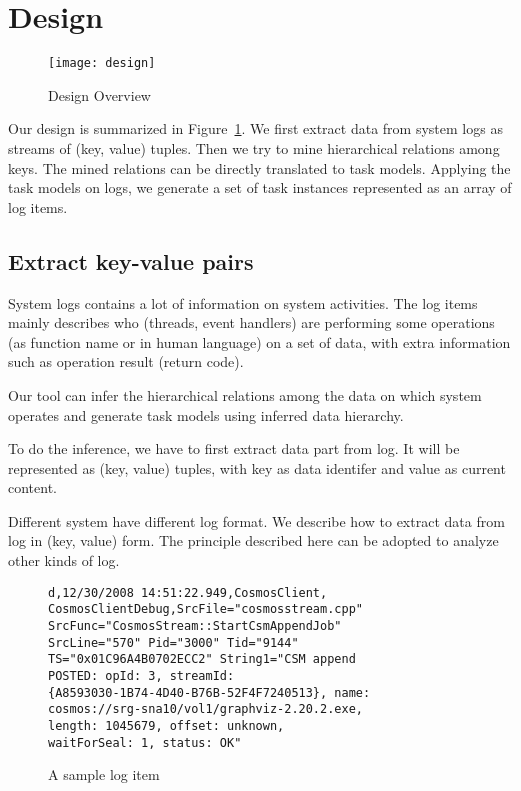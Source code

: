 
\section{Design}
\label{sec:design}

\begin{figure}
\centering
\texttt{[image: design]}
\caption{Design Overview}
\label{fig:design}
\end{figure}

Our design is summarized in Figure~\ref{fig:design}. We
first extract data from system logs as streams of (key,
value) tuples. Then we try to mine hierarchical relations
among keys. The mined relations can be directly translated
to task models. Applying the task models on logs, we
generate a set of task instances represented as an array of
log items.


\subsection{Extract key-value pairs}

System logs contains a lot of information on system
activities. The log items mainly describes who (threads,
event handlers) are performing some operations (as function
name or in human language) on a set of data, with extra
information such as operation result (return code).

Our tool can infer the hierarchical relations among the data
on which system operates and generate task models using
inferred data hierarchy.

To do the inference, we have to first extract data part
from log. It will be represented as (key, value) tuples,
with key as data identifer and value as current content.

Different system have different log format. We describe how
to extract data from \cosmos log in (key, value) form. The
principle described here can be adopted to analyze other
kinds of log.

\begin{figure}
\begin{verbatim}
d,12/30/2008 14:51:22.949,CosmosClient,
CosmosClientDebug,SrcFile="cosmosstream.cpp"
SrcFunc="CosmosStream::StartCsmAppendJob"
SrcLine="570" Pid="3000" Tid="9144"
TS="0x01C96A4B0702ECC2" String1="CSM append
POSTED: opId: 3, streamId:
{A8593030-1B74-4D40-B76B-52F4F7240513}, name:
cosmos://srg-sna10/vol1/graphviz-2.20.2.exe,
length: 1045679, offset: unknown,
waitForSeal: 1, status: OK"
\end{verbatim}
\caption{A sample log item}
\label{fig:logitem}
\end{figure}

